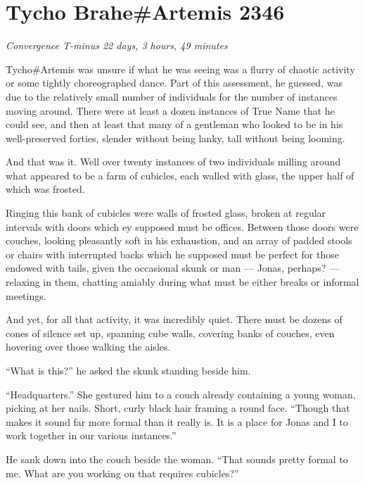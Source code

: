 \hypertarget{tycho-braheartemis-2346}{%
\chapter{Tycho Brahe\#Artemis 2346}\label{tycho-braheartemis-2346}}

\begin{center}
\emph{Convergence T-minus 22 days, 3 hours, 49 minutes}
\end{center}

\noindent Tycho\#Artemis was unsure if what he was seeing was a flurry of chaotic activity or some tightly choreographed dance. Part of this assessment, he guessed, was due to the relatively small number of individuals for the number of instances moving around. There were at least a dozen instances of True Name that he could see, and then at least that many of a gentleman who looked to be in his well-preserved forties, slender without being lanky, tall without being looming.

And that was it. Well over twenty instances of two individuals milling around what appeared to be a farm of cubicles, each walled with glass, the upper half of which was frosted.

Ringing this bank of cubicles were walls of frosted glass, broken at regular intervals with doors which ey supposed must be offices. Between those doors were couches, looking pleasantly soft in his exhaustion, and an array of padded stools or chairs with interrupted backs which he supposed must be perfect for those endowed with tails, given the occasional skunk or man — Jonas, perhaps? — relaxing in them, chatting amiably during what must be either breaks or informal meetings.

And yet, for all that activity, it was incredibly quiet. There must be dozens of cones of silence set up, spanning cube walls, covering banks of couches, even hovering over those walking the aisles.

``What is this?'' he asked the skunk standing beside him.

``Headquarters.'' She gestured him to a couch already containing a young woman, picking at her nails. Short, curly black hair framing a round face. ``Though that makes it sound far more formal than it really is. It is a place for Jonas and I to work together in our various instances.''

He sank down into the couch beside the woman. ``That sounds pretty formal to me. What are you working on that requires cubicles?''

